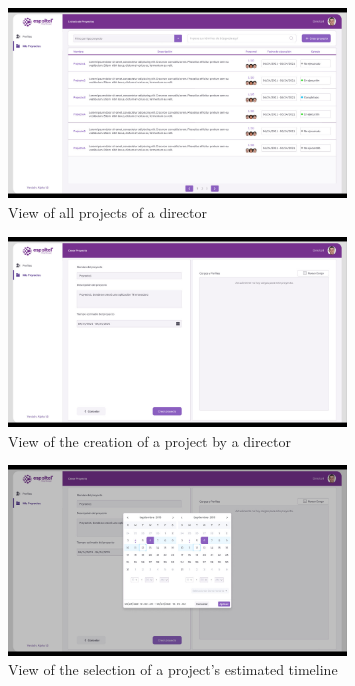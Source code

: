 \documentclass{scrreprt}
\begin{document}
\begin{figure}[H]
	\centering \small
	\includegraphics[width=0.8\textwidth]{WebPrototype/wflow-7.jpeg}
	\caption{View of all projects of a director}
\end{figure}

\begin{figure}[H]
	\centering \small
	\includegraphics[width=0.8\textwidth]{WebPrototype/wflow-8.jpeg}
	\caption{View of the creation of a project by a director}
\end{figure}

\begin{figure}[H]
	\centering \small
	\includegraphics[width=0.8\textwidth]{WebPrototype/wflow-9.jpeg}
	\caption{View of the selection of a project's estimated timeline}
\end{figure}
\end{document}
